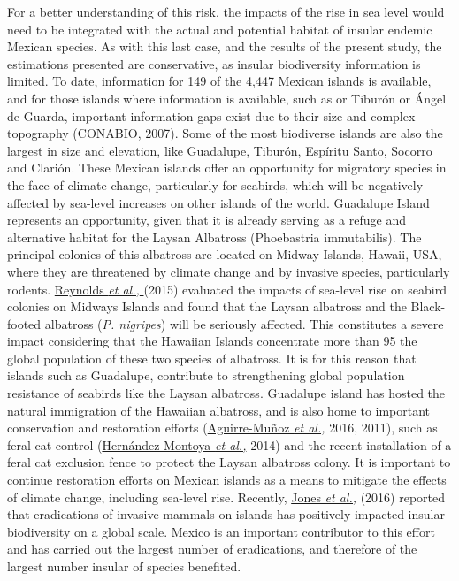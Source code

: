 \documentclass{article} %
\begin{document}
For a better understanding of this risk, the impacts of the rise in sea level would need
to be integrated with the actual and potential habitat of insular endemic Mexican
species. As with this last case, and the results of the present study, the estimations
presented are conservative, as insular biodiversity information is limited. To date,
information for 149 of the 4,447 Mexican islands is available, and for those islands
where information is available, such as or Tiburón or Ángel de Guarda, important
information gaps exist due to their size and complex topography (CONABIO, 2007).
Some of the most biodiverse islands are also the largest in size and elevation, like
Guadalupe, Tiburón, Espíritu Santo, Socorro and Clarión. These Mexican islands offer
an opportunity for migratory species in the face of climate change, particularly for
seabirds, which will be negatively affected by sea-level increases on other islands of
the world. Guadalupe Island represents an opportunity, given that it is already
serving as a refuge and alternative habitat for the Laysan Albatross (Phoebastria
immutabilis). The principal colonies of this albatross are located on Midway Islands,
Hawaii, USA, where they are threatened by climate change and by invasive species,
particularly rodents. \hyperlink{reynolds}{Reynolds \textit{et al.,} }(2015) evaluated the impacts of sea-level rise
on seabird colonies on Midways Islands and found that the Laysan albatross and the
Black-footed albatross (\textit{P. nigripes}) will be seriously affected. This constitutes a
severe impact considering that the Hawaiian Islands concentrate more than 95%
the global population of these two species of albatross. It is for this reason that
islands such as Guadalupe, contribute to strengthening global population resistance
of seabirds like the Laysan albatross. Guadalupe island has hosted the natural
immigration of the Hawaiian albatross, and is also home to important conservation
and restoration efforts (\hyperlink{aguirre}{Aguirre-Muñoz \textit{et al.,}} 2016, 2011), such as feral cat control
(\hyperlink{hernandez}{Hernández-Montoya \textit{et al.,}} 2014) and the recent installation of a feral cat exclusion
fence to protect the Laysan albatross colony. It is important to continue restoration
efforts on Mexican islands as a means to mitigate the effects of climate change,
including sea-level rise. Recently, \hyperlink{jones}{Jones \textit{et al.,}} (2016) reported that eradications of
invasive mammals on islands has positively impacted insular biodiversity on a global
scale. Mexico is an important contributor to this effort and has carried out the largest
number of eradications, and therefore of the largest number insular of species
benefited.\\
\end{document}
